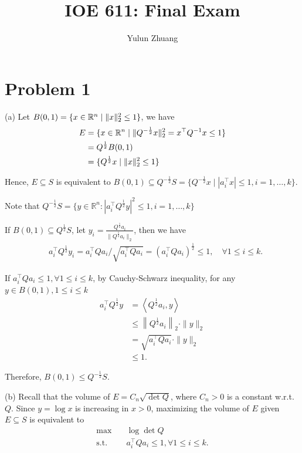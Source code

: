 \documentclass[11pt]{article}
\newcommand{\half}{\frac{1}{2}} %
\newcommand{\T}{^\top}          %
\begin{document}
\title{IOE 611: Final Exam}
\author{Yulun Zhuang}
\maketitle
\section*{Problem 1}
(a)
Let $B(0, 1) = \{x\in{{\mathbb{R}}}^n \mid \|x\|^2_2\leq 1\}$, we have
\begin{align*}
  E &= \{x\in\real^n \mid\|Q^{-\half}x\|^2_2 = x\T Q^{-1}x \leq 1\}\\
  &= Q^{\half} B(0, 1)\\
  &= \{Q^{\half} x \mid \|x\|^2_2\leq 1\}
\end{align*}

Hence, $E\subseteq S$ is equivalent to $B(0, 1) \subseteq Q^{-\half}S = \{Q^{-\half}x \mid |a\T_ix|\leq 1, i=1, \dots, k\}$.

Note that $Q^{-\frac{1}{2}} S=\{y \in \mathbb{R}^n:|a_i^{\top} Q^{\frac{1}{2}} y|^2 \leq 1, i=1, \ldots, k\}$

If $B(0,1) \subseteq Q^{\frac{1}{2}} S$, let $y_i=\frac{Q^{\frac{1}{2}} a_i}{\|Q^{\frac{1}{2}} a_i\|_2}$, then we have
$$
\begin{aligned}
& a_i^{\top} Q^{\frac{1}{2}} y_i=a_i^{\top} Q a_i / \sqrt{a_i^{\top} Q a_i}=\left(a_i^{\top} Q a_i\right)^{\frac{1}{2}} \leq 1, \quad \forall 1 \leq i \leq k .
\end{aligned}
$$

If $a_i^{\top} Q a_i \leq 1, \forall 1 \leq i \leq k$, by Cauchy-Schwarz inequality, for any $y \in B(0,1), 1 \leq i \leq k$
$$
\begin{aligned}
a_i^{\top} Q^{\frac{1}{2}} y & =\left\langle Q^{\frac{1}{2}} a_i, y\right\rangle \\
& \leq\left\|Q^{\frac{1}{2}} a_i\right\|_2 \cdot\|y\|_2 \\
& =\sqrt{a_i^{\top} Q a_i} \cdot\|y\|_2 \\
& \leq 1 .
\end{aligned}
$$

Therefore, $B(0,1) \leq Q^{-\frac{1}{2}} S$.

(b)
Recall that the volume of $E = C_n\sqrt{\det Q}$, where $C_n > 0$ is a constant w.r.t. $Q$. Since $y=\log x$ is increasing in $x>0$, maximizing the volume of $E$ given $E\subseteq S$ is equivalent to
\begin{align*}
  \max\quad & \log\det Q\\
  \text{s.t.}\quad & a_i\T Q a_i \leq 1, \forall 1\leq i \leq k.
\end{align*}
\end{document}
